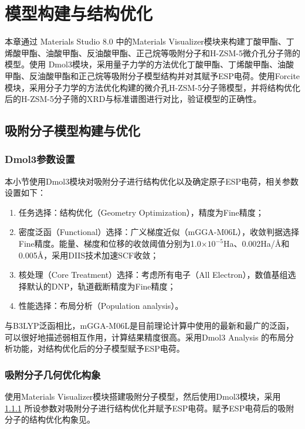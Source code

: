 \section{模型构建与结构优化}
\par{本章通过 Materials Studio 8.0 中的Materials Visualizer模块来构建丁酸甲酯、丁烯酸甲酯、油酸甲酯、反油酸甲酯、正己烷等吸附分子和H-ZSM-5微介孔分子筛的模型。使用 Dmol3模块，采用量子力学的方法优化丁酸甲酯、丁烯酸甲酯、油酸甲酯、反油酸甲酯和正己烷等吸附分子模型结构并对其赋予ESP电荷。使用Forcite模块，采用分子力学的方法优化构建的微介孔H-ZSM-5分子筛模型，并将结构优化后的H-ZSM-5分子筛的XRD与标准谱图进行对比，验证模型的正确性。}
\subsection{吸附分子模型构建与优化}
\subsubsection{Dmol3参数设置}\label{Dmol3参数设置}
\par{本小节使用Dmol3模块对吸附分子进行结构优化以及确定原子ESP电荷，相关参数设置如下：}
\begin{enumerate}
    \item 任务选择：结构优化（Geometry Optimization），精度为Fine精度；
    \item 密度泛函（Functional）选择：广义梯度近似（mGGA-M06L），收敛判据选择Fine精度。能量、梯度和位移的收敛阈值分别为1.0×$10^{-5}$Ha、0.002Ha/Å和0.005Å，采用DIIS技术加速SCF收敛；
    \item 核处理（Core Treatment）选择：考虑所有电子（All Electron），数值基组选择默认的DNP，轨道截断精度为Fine精度；
    \item 性能选择：布局分析（Population analysis）。
\end{enumerate}
\par{与B3LYP泛函相比，mGGA-M06L是目前理论计算中使用的最新和最广的泛函，可以很好地描述弱相互作用，计算结果精度很高\cite{zhao2006new,zhao2011applications}。采用Dmol3 Analysis 的布局分析功能，对结构优化后的分子模型赋予ESP电荷。}
\subsubsection{吸附分子几何优化构象}
\par{使用Materials Visualizer模块搭建吸附分子模型，然后使用Dmol3模块，采用 \ref{Dmol3参数设置} 所设参数对吸附分子进行结构优化并赋予ESP电荷。赋予ESP电荷后的吸附分子的结构优化构象见。}


